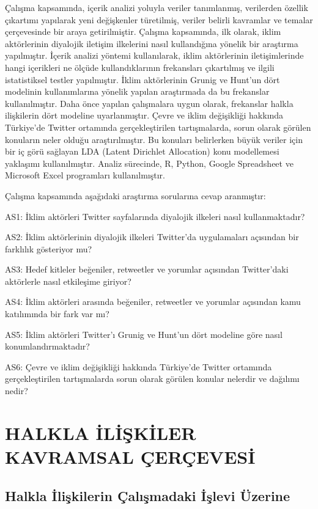 \documentclass[
]{book}
\begin{document}
Çalışma kapsamında, içerik analizi \citep{yildirim2018sosyal} yoluyla veriler tanımlanmış, verilerden özellik çıkartımı yapılarak yeni değişkenler türetilmiş, veriler belirli kavramlar ve temalar çerçevesinde bir araya getirilmiştir. Çalışma kapsamında, ilk olarak, iklim aktörlerinin diyalojik iletişim ilkelerini nasıl kullandığına yönelik bir araştırma yapılmıştır. İçerik analizi yöntemi kullanılarak, iklim aktörlerinin iletişimlerinde hangi içerikleri ne ölçüde kullandıklarının frekansları çıkartılmış ve ilgili istatistiksel testler yapılmıştır. İklim aktörlerinin Grunig ve Hunt'un dört modelinin kullanımlarına yönelik yapılan araştırmada da bu frekanslar kullanılmıştır. Daha önce yapılan çalışmalara uygun olarak, frekanslar halkla ilişkilerin dört modeline uyarlanmıştır. Çevre ve iklim değişikliği hakkında Türkiye'de Twitter ortamında gerçekleştirilen tartışmalarda, sorun olarak görülen konuların neler olduğu araştırılmıştır. Bu konuları belirlerken büyük veriler için bir iç görü sağlayan LDA (Latent Dirichlet Allocation) konu modellemesi yaklaşımı kullanılmıştır. Analiz sürecinde, R, Python, Google Spreadsheet ve Microsoft Excel programları kullanılmıştır.

Çalışma kapsamında aşağıdaki araştırma sorularına cevap aranmıştır:

AS1: İklim aktörleri Twitter sayfalarında diyalojik ilkeleri nasıl kullanmaktadır?

AS2: İklim aktörlerinin diyalojik ilkeleri Twitter'da uygulamaları açısından bir farklılık gösteriyor mu?

AS3: Hedef kitleler beğeniler, retweetler ve yorumlar açısından Twitter'daki aktörlerle nasıl etkileşime giriyor?

AS4: İklim aktörleri arasında beğeniler, retweetler ve yorumlar açısından kamu katılımında bir fark var mı?

AS5: İklim aktörleri Twitter'ı Grunig ve Hunt'un dört modeline göre nasıl konumlandırmaktadır?

AS6: Çevre ve iklim değişikliği hakkında Türkiye'de Twitter ortamında gerçekleştirilen tartışmalarda sorun olarak görülen konular nelerdir ve dağılımı nedir?

\hypertarget{intro}{%
\chapter{HALKLA İLİŞKİLER KAVRAMSAL ÇERÇEVESİ}\label{intro}}

\hypertarget{halkla-iliux15fkilerin-uxe7alux131ux15fmadaki-iux15flevi-uxfczerine}{%
\section{Halkla İlişkilerin Çalışmadaki İşlevi Üzerine}\label{halkla-iliux15fkilerin-uxe7alux131ux15fmadaki-iux15flevi-uxfczerine}}
\end{document}
